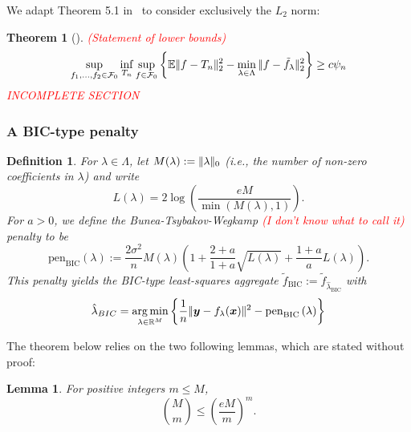 \documentclass[12pt, letter paper]{article}
\newcommand{\1}{\mathmybb{1}}
\newtheorem{definition}{Definition}[section]
\newtheorem{theorem}[proposition]{Theorem}
\newtheorem{lemma}[proposition]{Lemma}
\DeclareMathOperator*{\argmin}{arg\,min}
\newcommand{\R}{\mathbb{R}}
\newcommand{\0}{\emptyset}
\newcommand{\E}{\mathbb{E}}
\newcommand{\paren}[1]{\left(#1 \right)}
\newcommand{\set}[1]{\left\{ #1 \right\}}
\newcommand{\norm}[1]{|\hspace{-1pt}|#1 |\hspace{-1pt}|}
\newcommand{\normsq}[1]{\norm{#1}^{2}}
\newcommand{\x}{\boldsymbol{x}}
\newcommand{\y}{\boldsymbol{y}}
\newcommand{\ftilde}[1]{\tilde{f}_{#1}}
\newcommand{\lambdahat}[1]{\hat{\lambda}_{#1}}
\newcommand{\penBIC}[1]{\mathrm{pen}_{\mathrm{BIC}}\paren{#1}}
\begin{document}
We adapt Theorem 5.1 in~\textcite{bunea_2007} to consider exclusively the \(L_{2}\) norm:

\begin{theorem}[\cite{bunea_2007}]\label{prop:buneath5.1}
    \textcolor{red}{(Statement of lower bounds)}
    \[\sup_{f_1, \ldots, f_2\in\mathcal{F}_{0}} \inf_{T_n}\sup_{f\in\mathcal{F}_0} \set{\E\normsq{f - T_n}_{2} - \min_{\lambda\in\Lambda}\normsq{f - \ftilde{\lambda}}_{2}} \geq c\psi_{n}\]
    \textcolor{red}{INCOMPLETE SECTION}
\end{theorem}

\subsubsection{A BIC-type penalty}
\begin{definition}
    For \(\lambda\in\Lambda\), let \(M(\lambda) := \norm{\lambda}_{0}\) (i.e., the number of non-zero coefficients in \(\lambda\)) and write
    \[L(\lambda) = 2\log\paren{\frac{eM}{\min(M(\lambda), 1)}}.\]
    For \(a>0\), we define the Bunea-Tsybakov-Wegkamp \textcolor{red}{(I don't know what to call it)} penalty to be
    \[\penBIC{\lambda} := \frac{2\sigma^{2}}{n}M(\lambda)\paren{1+\frac{2+a}{1+a}\sqrt{L(\lambda)} + \frac{1+a}{a}{L(\lambda)}}.\]
    This penalty yields the BIC-type least-squares aggregate \(\ftilde{\mathrm{BIC}} := \ftilde{\lambdahat{\mathrm{BIC}}}\) with 
    \[\lambdahat{BIC}=\argmin_{\lambda\in\R^{M}}\set{\frac{1}{n}\normsq{\y - f_{\lambda}(\x)} - \penBIC{\lambda}}\]
\end{definition}

The theorem below relies on the two following lemmas, which are stated without proof:

\begin{lemma}\label{lemm:binombound}
    For positive integers \(m \leq M\),
    \[\binom{M}{m} \leq \paren{\frac{eM}{m}}^m.\]
\end{lemma}
\end{document}
